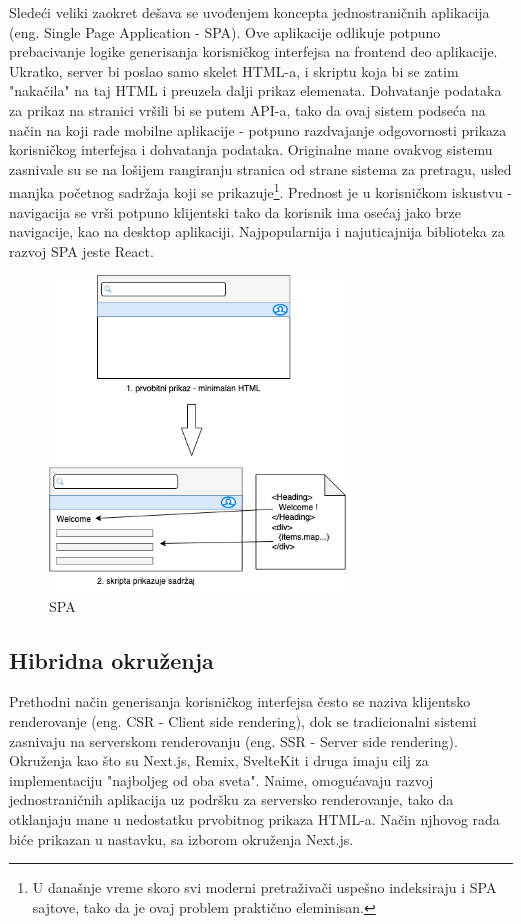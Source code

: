 \documentclass[12pt,oneside]{memoir}
\begin{document}
Sledeći veliki zaokret dešava se uvođenjem koncepta jednostraničnih aplikacija (eng. Single Page Application - SPA). Ove aplikacije odlikuje potpuno prebacivanje logike generisanja korisničkog interfejsa na frontend deo aplikacije. Ukratko, server bi poslao samo skelet HTML-a, i skriptu koja bi se zatim "nakačila" na taj HTML i preuzela dalji prikaz elemenata. Dohvatanje podataka za prikaz na stranici vršili bi se putem API-a, tako da ovaj sistem podseća na način na koji rade mobilne aplikacije - potpuno razdvajanje odgovornosti prikaza korisničkog interfejsa i dohvatanja podataka. Originalne mane ovakvog sistemu zasnivale su se na lošijem rangiranju stranica od strane sistema za pretragu, usled manjka početnog sadržaja koji se prikazuje\footnote{U današnje vreme skoro svi moderni pretraživači uspešno indeksiraju i SPA sajtove, tako da je ovaj problem praktično eleminisan.}. Prednost je u korisničkom iskustvu - navigacija se vrši potpuno klijentski tako da korisnik ima osećaj jako brze navigacije, kao na desktop aplikaciji. Najpopularnija i najuticajnija biblioteka za razvoj SPA jeste React.

\begin{figure}[h]
  \centering
  \includegraphics[width=0.7\textwidth]{docs/images/ch_4/frontend-dev-phase2.png} 
  \caption{SPA}
  \label{fig:sample}
\end{figure}

\subsection{Hibridna okruženja}

Prethodni način generisanja korisničkog interfejsa često se naziva klijentsko renderovanje (eng. CSR - Client side rendering), dok se tradicionalni sistemi zasnivaju na serverskom renderovanju (eng. SSR - Server side rendering). Okruženja kao što su Next.js\cite{nextjsdocs}, Remix\cite{remixdocs}, SvelteKit\cite{sveltekitdocs} i druga imaju cilj za implementaciju "najboljeg od oba sveta". Naime, omogućavaju razvoj jednostraničnih aplikacija uz podršku za serversko renderovanje, tako da otklanjaju mane u nedostatku prvobitnog prikaza HTML-a. Način njhovog rada biće prikazan u nastavku, sa izborom okruženja Next.js.
\end{document}

